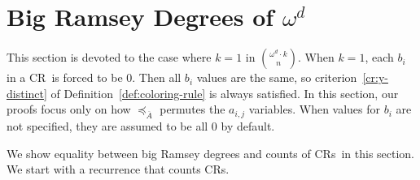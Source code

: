 \documentclass[11pt]{article}
\newcommand{\om}{\omega}
\newcommand{\crulenospace}{CR}
\newcommand{\crule}{\crulenospace~}
\newcommand{\crules}{\crulenospace s~}
\newcommand{\crulesnospace}{\crulenospace s}
\newcommand{\xleq}{\preceq_{\overline{A}}}
\newcommand{\numpoints}{n}
\newcommand{\inumpoints}{i}
\newcommand{\idegr}{j}
\newcommand{\commonconst}{a}
\newcommand{\rareconst}{b}
\theoremstyle{plain}
\theoremstyle{definition}
\begin{document}
\section{Big Ramsey Degrees of \texorpdfstring{$\om^d$}{omega d}}\label{se:ord} 
This section is devoted to the case where $k=1$ in $\binom{\om^d \cdot k}{\numpoints}$. When $k=1$, each $\rareconst_{\inumpoints}$ in a \crule is forced to be 0. Then all $\rareconst_{\inumpoints}$ values are the same, so criterion~\ref{cr:y-distinct} of Definition~\ref{def:coloring-rule} is always satisfied. In this section, our proofs focus only on how $\xleq$ permutes the $\commonconst_{\inumpoints,\idegr}$ variables. When values for $\rareconst_{\inumpoints}$ are not specified, they are assumed to be all 0 by default.

We show equality between big Ramsey degrees and counts of \crules in this
section. We start with a recurrence that counts \crulesnospace.
\end{document}
